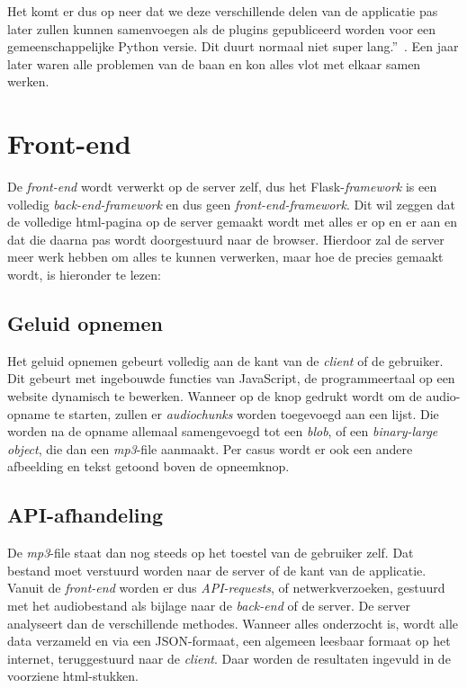 Het komt er dus op neer dat we deze verschillende delen van de applicatie pas later zullen
kunnen samenvoegen als de plugins gepubliceerd worden voor een gemeenschappelijke
Python versie. Dit duurt normaal niet super lang.''~\autocite{Standaert2021}.
Een jaar later waren alle problemen van de baan en kon alles vlot met elkaar samen werken.

\section{Front-end}
De \textit{front-end} wordt verwerkt op de server zelf, dus het Flask-\textit{framework} is een volledig \textit{back-end-framework} en dus geen \textit{front-end-framework}. Dit wil zeggen dat de volledige html-pagina op de server gemaakt wordt met alles er op en er aan en dat die daarna pas wordt doorgestuurd naar de browser. Hierdoor zal de server meer werk hebben om alles te kunnen verwerken, maar hoe de  precies gemaakt wordt, is hieronder te lezen:

\subsection{Geluid opnemen}
Het geluid opnemen gebeurt volledig aan de kant van de \textit{client} of de gebruiker. Dit gebeurt met ingebouwde functies van JavaScript, de programmeertaal op een website dynamisch te bewerken. Wanneer op de knop gedrukt wordt om de audio-opname te starten, zullen er \textit{audiochunks } worden toegevoegd aan een lijst. Die worden na de opname allemaal samengevoegd tot een \textit{blob}, of een \textit{binary-large object}, die dan een \textit{mp3}-file aanmaakt.
Per casus wordt er ook een andere afbeelding en tekst getoond boven de opneemknop.

\subsection{API-afhandeling}
De \textit{mp3}-file staat dan nog steeds op het toestel van de gebruiker zelf. Dat bestand moet verstuurd worden naar de server of de  kant van de applicatie.
Vanuit de \textit{front-end} worden er dus \textit{API-requests}, of netwerkverzoeken, gestuurd met het audiobestand als bijlage naar de \textit{back-end} of de server. De server analyseert dan de verschillende methodes. Wanneer alles onderzocht is, wordt alle data verzameld en via een JSON-formaat, een algemeen leesbaar formaat op het internet, teruggestuurd naar de \textit{client}. Daar worden de resultaten ingevuld in de voorziene html-stukken.

